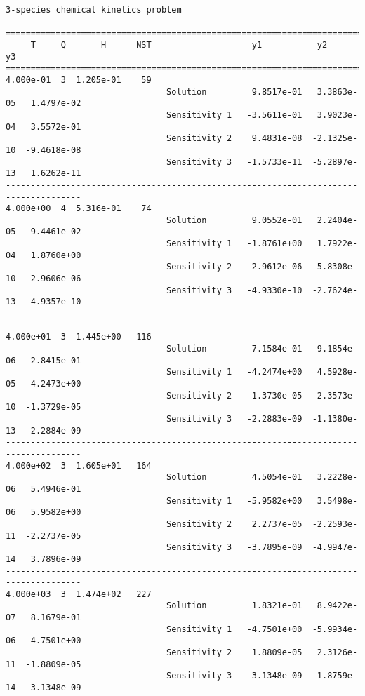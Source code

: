 \begin{verbatim}
3-species chemical kinetics problem

=====================================================================================
     T     Q       H      NST                    y1           y2           y3    
=====================================================================================
4.000e-01  3  1.205e-01    59
                                Solution         9.8517e-01   3.3863e-05   1.4797e-02 
                                Sensitivity 1   -3.5611e-01   3.9023e-04   3.5572e-01 
                                Sensitivity 2    9.4831e-08  -2.1325e-10  -9.4618e-08 
                                Sensitivity 3   -1.5733e-11  -5.2897e-13   1.6262e-11 
-------------------------------------------------------------------------------------
4.000e+00  4  5.316e-01    74
                                Solution         9.0552e-01   2.2404e-05   9.4461e-02 
                                Sensitivity 1   -1.8761e+00   1.7922e-04   1.8760e+00 
                                Sensitivity 2    2.9612e-06  -5.8308e-10  -2.9606e-06 
                                Sensitivity 3   -4.9330e-10  -2.7624e-13   4.9357e-10 
-------------------------------------------------------------------------------------
4.000e+01  3  1.445e+00   116
                                Solution         7.1584e-01   9.1854e-06   2.8415e-01 
                                Sensitivity 1   -4.2474e+00   4.5928e-05   4.2473e+00 
                                Sensitivity 2    1.3730e-05  -2.3573e-10  -1.3729e-05 
                                Sensitivity 3   -2.2883e-09  -1.1380e-13   2.2884e-09 
-------------------------------------------------------------------------------------
4.000e+02  3  1.605e+01   164
                                Solution         4.5054e-01   3.2228e-06   5.4946e-01 
                                Sensitivity 1   -5.9582e+00   3.5498e-06   5.9582e+00 
                                Sensitivity 2    2.2737e-05  -2.2593e-11  -2.2737e-05 
                                Sensitivity 3   -3.7895e-09  -4.9947e-14   3.7896e-09 
-------------------------------------------------------------------------------------
4.000e+03  3  1.474e+02   227
                                Solution         1.8321e-01   8.9422e-07   8.1679e-01 
                                Sensitivity 1   -4.7501e+00  -5.9934e-06   4.7501e+00 
                                Sensitivity 2    1.8809e-05   2.3126e-11  -1.8809e-05 
                                Sensitivity 3   -3.1348e-09  -1.8759e-14   3.1348e-09 

\end{verbatim}
